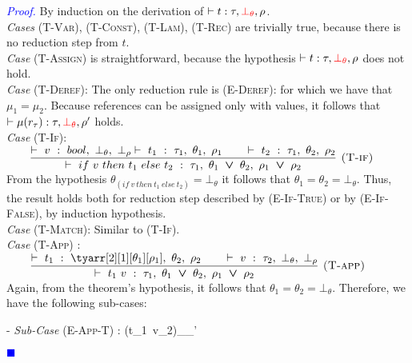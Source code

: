 \documentclass[a4paper,11pt,oneside]{article}
\theoremstyle{plain}
\renewenvironment{proof}{\noindent \begin{adjustwidth}{1.5em}{} \textcolor{blue}{\textit{Proof.}}}
{{\begin{tiny}\textcolor{blue}{$\blacksquare$}\end{tiny}}
\end{adjustwidth}~\\\noindent}
\newcommand{\bvee}{\boldsymbol{~\vee~}}
\newcommand{\typing}[4]{\vdash~#1~:~#2,~#3,~#4}
\newcommand{\bth}{\bot_\theta}
\newcommand{\brh}{\bot_\rho}
\newcommand{\mem}{_{\mu}}\newcommand{\memp}{_{\mu'}}
\newcommand{\ghead}[2]{~#1~\stackrel{\epsilon}{\rightarrow}~#2~}
\begin{document}
\begin{proof}
\label{proof:preserv-prop-p}
  By induction on the derivation of $\vdash t : \tau, \textcolor{red}{\bth}, \rho$.\\
  
  \noindent\textit{Cases} \textsc{(T-Var), (T-Const), (T-Lam), (T-Rec)}  are trivially true, because there is no reduction step from $t$. \\
  
  \noindent\textit{Case} \textsc{(T-Assign)} is straightforward, because the hypothesis 
  $\vdash t : \tau, \textcolor{red}{\bth}, \rho $ does not hold.\\
  
   \noindent\textit{Case} \textsc{(T-Deref)}: The only reduction rule is \textsc{(E-Deref)}:  \infax[E-Deref]{\ghead{{!r_\tau}_{\mem}} {\mu_{}(r_\tau)}}
    for which we have that $\mu_1 = \mu_2$.  
    Because references can be assigned only with values, it follows that $\vdash \mu(r_\tau) : \tau, \textcolor{red}{\bth}, \rho' $ holds. \\ 

  \noindent\textit{Case} \textsc{(T-If)}: $\qquad \dfrac
	{
		\typing{v}{bool}{\bth}{\brh}
		\typing{t_1}{\tau_1}{\theta_1}{\rho_1} \qquad
		\typing{t_2}{\tau_1}{\theta_2}{\rho_2}
	}
	{	\typing{if~v~then~t_1~else~t_2}
		{\tau_1}{\theta_1 \bvee \theta_2}{\rho_1 \bvee \rho_2}}
	{\textsc{  (T-if)}}$ \\
  
	From the hypothesis $\theta_{(if~v~then~t_1~else~t_2)} = \bth$ it follows that $\theta_1 = \theta_2 = \bth$. Thus, the result holds both for reduction step described by \textsc{(E-If-True)} or by \textsc{(E-If-False)}, by induction hypothesis. \\
   
  \noindent\textit{Case} \textsc{(T-Match)}: \qquad Similar to \textsc{(T-If)}. \\
   
   \noindent\textit{Case} \textsc{(T-App)} : $\qquad \dfrac
	{
		\typing{t_1}{\tyarr[2][1][\theta_1][\rho_1]}{\theta_2}{\rho_2} \qquad
		\typing{v}{\tau_2}{\bth}{\brh}}
	{
		\typing{t_1~v}{\tau_1}{\theta_1 \bvee \theta_2}{\rho_1 \bvee \rho_2}}
	{
		\textsc{  (T-app)}} $ \\
		
Again, from the theorem's hypothesis, it follows that $\theta_1 = \theta_2 = \bth$.
Therefore, we have the following sub-cases: 

- \textit{Sub-Case} \textsc{(E-App-T)} :
 \infrule[E-App-T]	
	{{t_{1}}\mem \rightarrow {{t'}_{1}}\memp}
	{{(t_{1}~v_2)}\mem {}\memp}
	

\end{proof}
\end{document}
